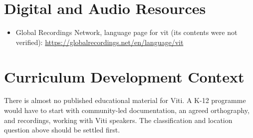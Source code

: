 \documentclass[12pt]{article}
\begin{document}
\section{Digital and Audio Resources}
\begin{itemize}
\item Global Recordings Network, language page for vit (its contents were not verified): \url{https://globalrecordings.net/en/language/vit}
\end{itemize}

\section{Curriculum Development Context}
There is almost no published educational material for Viti. A K-12 programme would have to start with community-led documentation, an agreed orthography, and recordings, working with Viti speakers. The classification and location question above should be settled first.
\end{document}
